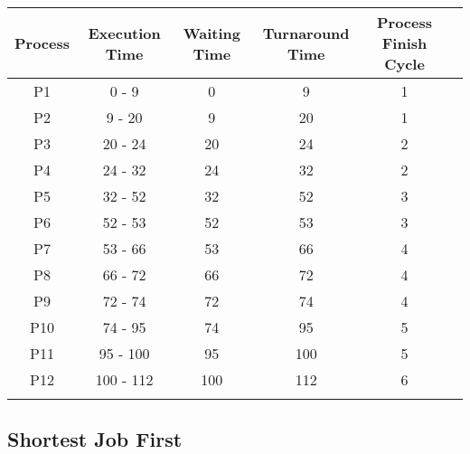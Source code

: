 \documentclass{article}
\begin{document}
\begin{center}
    \begin{tabular}{|c|c|c|c|c|c|}
    \hline
    \rowcolor{darkblue}
    {\textbf{Process}} &{\textbf{Execution Time}} & {\textbf{Waiting Time}} & {\textbf{Turnaround Time}} & {\textbf{Process Finish Cycle}} \\
    \hline \rowcolor{lightblue}
    P1 & 0 - 9 & 0 & 9 & 1\\
    \hline
    P2 & 9 - 20 & 9 & 20 & 1 \\
    \hline \rowcolor{lightblue}
    P3 & 20 - 24 & 20 & 24 & 2 \\
    \hline
    P4 & 24 - 32 & 24 & 32 & 2 \\
    \hline \rowcolor{lightblue}
    P5 & 32 - 52 & 32 & 52 & 3 \\
    \hline
    P6 & 52 - 53 & 52 & 53 & 3 \\
    \hline \rowcolor{lightblue}
    P7 & 53 - 66 & 53 & 66 & 4 \\
    \hline
    P8 & 66 - 72 & 66 & 72 & 4 \\
    \hline \rowcolor{lightblue}
    P9 & 72 - 74 & 72 & 74 & 4 \\
    \hline
    P10 & 74 - 95 & 74 & 95 & 5 \\
    \hline \rowcolor{lightblue}
    P11 & 95 - 100 & 95 & 100 & 5 \\
    \hline
    P12 & 100 - 112 & 100 & 112 & 6 \\
    \hline \rowcolor{lightblue}
    \end{tabular}
\end{center}

\subsection{Shortest Job First}
\end{document}
